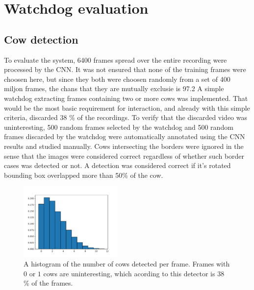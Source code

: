 \documentclass{cta-author}
\begin{document}
\section{Watchdog evaluation}
\subsection{Cow detection}
\label{sec:num}
To evaluate the system, 6400 frames spread over the entire recording were processed by the CNN. 
It was not ensured that none of the training frames were choosen here, but since they both were choosen 
randomly from a set of 400 miljon frames, the chans that they are mutually exclusie is 97.2%
A simple watchdog extracting frames containing two or more cows was implemented. That would be the most basic 
requirement for interaction, and already with this simple criteria, discarded 38 \% of the recordings. To 
verify that the discarded video was uninteresting, 500 random frames selected by the watchdog and 500 random 
frames discarded by the watchdog were automatically annotated using the CNN results and studied manually. 
Cows intersecting the borders were ignored in the sense that the images were considered correct regardless of 
whether such border cases was detected or not. A detection was considered correct if it's rotated bounding 
box overlapped more than 50\% of the cow.

\begin{figure}[tb]
\begin{center}
  \includegraphics[width=0.45\textwidth]{cow_nbr_hist.pdf}
\end{center}
  \caption{A histogram of the number of cows detected per frame. Frames with $0$ or $1$ cows are 
uninteresting, which acording to this detector is 38 \% of the frames.}
  \label{fig:cowhist}
\end{figure}
\end{document}
